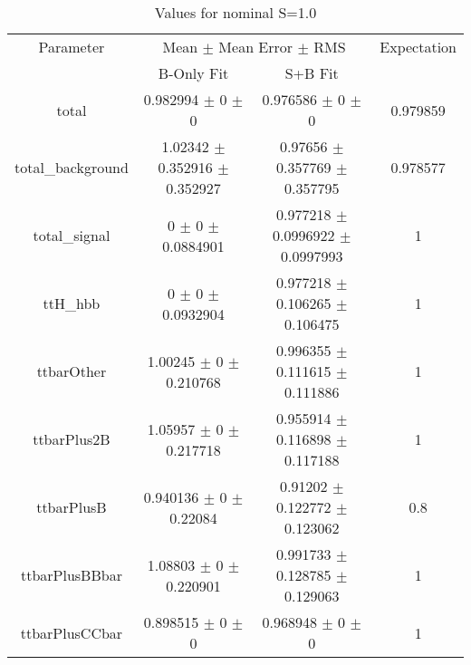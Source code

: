 \begin{table}
\centering
\caption{Values for nominal S=1.0}
\begin{tabular}{cccc}
\toprule
Parameter & \multicolumn{2}{c}{Mean $\pm$ Mean Error $\pm$ RMS} & Expectation\\
 & B-Only Fit & S+B Fit & \\
\midrule
total & \num{0.982994} $\pm$ \num{0} $\pm$ \num{0} & \num{0.976586} $\pm$ \num{0} $\pm$ \num{0} & \num{0.979859}\\
total\_background & \num{1.02342} $\pm$ \num{0.352916} $\pm$ \num{0.352927} & \num{0.97656} $\pm$ \num{0.357769} $\pm$ \num{0.357795} & \num{0.978577}\\
total\_signal & \num{0} $\pm$ \num{0} $\pm$ \num{0.0884901} & \num{0.977218} $\pm$ \num{0.0996922} $\pm$ \num{0.0997993} & \num{1}\\
ttH\_hbb & \num{0} $\pm$ \num{0} $\pm$ \num{0.0932904} & \num{0.977218} $\pm$ \num{0.106265} $\pm$ \num{0.106475} & \num{1}\\
ttbarOther & \num{1.00245} $\pm$ \num{0} $\pm$ \num{0.210768} & \num{0.996355} $\pm$ \num{0.111615} $\pm$ \num{0.111886} & \num{1}\\
ttbarPlus2B & \num{1.05957} $\pm$ \num{0} $\pm$ \num{0.217718} & \num{0.955914} $\pm$ \num{0.116898} $\pm$ \num{0.117188} & \num{1}\\
ttbarPlusB & \num{0.940136} $\pm$ \num{0} $\pm$ \num{0.22084} & \num{0.91202} $\pm$ \num{0.122772} $\pm$ \num{0.123062} & \num{0.8}\\
ttbarPlusBBbar & \num{1.08803} $\pm$ \num{0} $\pm$ \num{0.220901} & \num{0.991733} $\pm$ \num{0.128785} $\pm$ \num{0.129063} & \num{1}\\
ttbarPlusCCbar & \num{0.898515} $\pm$ \num{0} $\pm$ \num{0} & \num{0.968948} $\pm$ \num{0} $\pm$ \num{0} & \num{1}\\
\bottomrule
\end{tabular}
\end{table}